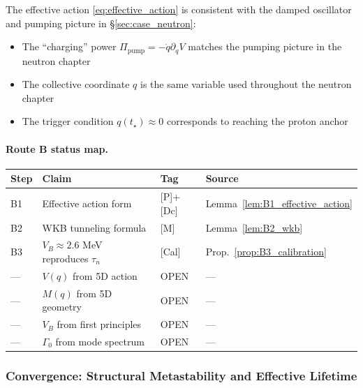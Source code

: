 The effective action \eqref{eq:effective_action} is consistent with the damped oscillator
and pumping picture in \S\ref{sec:case_neutron}:
\begin{itemize}[nosep]
  \item The ``charging'' power $\Pi_{\mathrm{pump}} = -\dot{q} \partial_q V$ matches
        the pumping picture in the neutron chapter
  \item The collective coordinate $q$ is the same variable used throughout the neutron chapter
  \item The trigger condition $q(t_\star) \approx 0$ corresponds to reaching the proton anchor
\end{itemize}

\paragraph{Route B status map.}

\begin{center}
\begin{tabular}{llll}
\toprule
\textbf{Step} & \textbf{Claim} & \textbf{Tag} & \textbf{Source} \\
\midrule
B1 & Effective action form & [P]+[Dc] & Lemma~\ref{lem:B1_effective_action} \\
B2 & WKB tunneling formula & [M] & Lemma~\ref{lem:B2_wkb} \\
B3 & $V_B \approx 2.6$ MeV reproduces $\tau_n$ & [Cal] & Prop.~\ref{prop:B3_calibration} \\
\midrule
--- & $V(q)$ from 5D action & OPEN & --- \\
--- & $M(q)$ from 5D geometry & OPEN & --- \\
--- & $V_B$ from first principles & OPEN & --- \\
--- & $\Gamma_0$ from mode spectrum & OPEN & --- \\
\bottomrule
\end{tabular}
\end{center}


\subsubsection{Convergence: Structural Metastability and Effective Lifetime}
\label{subsec:neutron_convergence}

